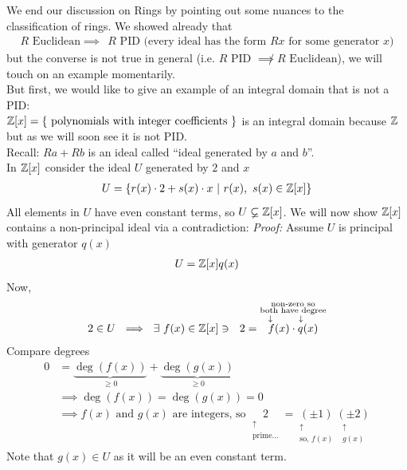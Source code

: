 We end our discussion on Rings by pointing out some nuances to the classification of rings. We
showed already that
\begin{align*}
    R \text{ Euclidean} \implies \ \ R \text{ PID (every ideal has the form $Rx$ for some generator $x$)}
\end{align*}
but the converse is not true in general (i.e. $R \text{ PID }\not \implies R \text{ Euclidean}$), we
will touch on an example momentarily. \\

But first, we would like to give an example of an integral domain that is not a PID: \\
${\mathbb{Z}}[x]=\{\text{ polynomials with integer coefficients }\}$ is an integral domain because ${\mathbb{Z}}$ but as
we will soon see it is not PID. \\
Recall: $Ra+Rb$ is an ideal called ``ideal generated by $a$ and $b$''. \\
In ${\mathbb{Z}}[x]$ consider the ideal $U$ generated by $2$ and $x$
\begin{align*}
    U=\{r(x)\cdot 2 + s(x)\cdot x \ | \ r(x), \ s(x)\in {\mathbb{Z}}[x]\}
\end{align*}
All elements in $U$ have even constant terms, so $U\varsubsetneq {\mathbb{Z}}[x]$. We will now show ${\mathbb{Z}}[x]$
contains a non-principal ideal via a contradiction:
\textit{Proof: } Assume $U$ is principal with generator $q(x)$
\begin{align*}
    U={\mathbb{Z}}[x]q(x)
\end{align*}
Now,
\begin{align*}
    2\in U \ \implies \ \exists \ f(x) \in \Z[x] \ni \ \ 2=\overset{\substack{\text{ non-zero so } \\ \text{both have degree} \\ \downarrow \ \ \ \ \ \ \  \downarrow \ \ \ \ }}{f(x) \cdot q(x)}
\end{align*}
Compare degrees
\begin{align*}
    0 &= \underbrace{\deg(f(x))}_{\geq 0}+\underbrace{\deg(g(x))}_{\geq 0} \\
    &\implies \deg(f(x))=\deg(g(x))=0 \\
    &\implies f(x) \text{ and }g(x) \text{ are integers, so } \underset{\substack{\uparrow \\ \text{prime...}}}{2}=\underset{\substack{\uparrow \\ \text{so, } f(x)}}{(\pm 1)}\underset{\substack{\uparrow \\ g(x)}}{(\pm 2)}
\end{align*}
Note that $g(x)\in U$ as it will be an even constant term. \\ \steezybreak
